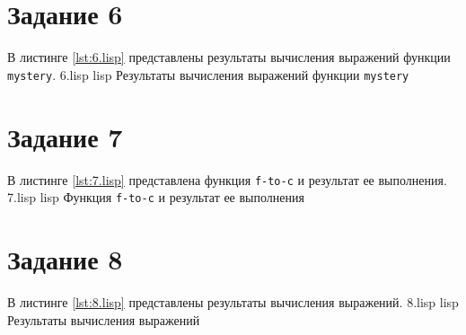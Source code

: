 \section{Задание 6}

В листинге \ref{lst:6.lisp} представлены результаты вычисления выражений функции \texttt{mystery}.
	{6.lisp}
	{lisp}
	{Результаты вычисления выражений функции \texttt{mystery}}
	
\section{Задание 7}
	
В листинге \ref{lst:7.lisp} представлена функция \texttt{f-to-c} и результат ее выполнения.
	{7.lisp}
	{lisp}
	{Функция \texttt{f-to-c} и результат ее выполнения}
	
\section{Задание 8}

В листинге \ref{lst:8.lisp} представлены результаты вычисления выражений.
	{8.lisp}
	{lisp}
	{Результаты вычисления выражений}